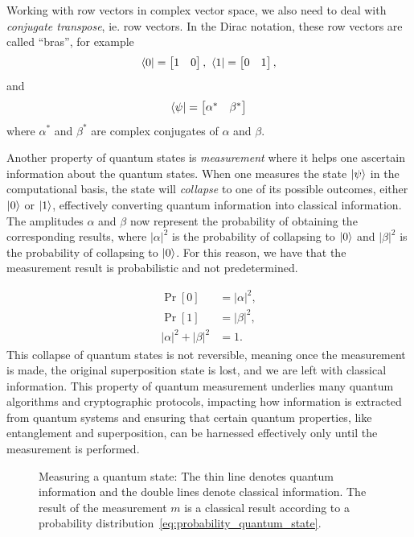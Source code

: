 \documentclass[cryptography,review,submit,pdftex,moreauthors,amsmath,amssymb,aps,strict]{Definitions/mdpi}
\begin{document}
Working with row vectors in complex vector space, we also need to deal with \textit{conjugate transpose}, ie. row vectors. In the Dirac notation, these row vectors are called ``bras'', for example
\begin{align}
    \bra{0}= \begin{bmatrix} 1 & 0 \end{bmatrix} \text{, }\bra{1}=\begin{bmatrix} 0 & 1
\end{bmatrix},
\end{align}
and 
\begin{align}
    \bra{\psi}=  \begin{bmatrix} \alpha^* & \beta^*\end{bmatrix}
\end{align}
where $\alpha^*$ and $\beta^*$ are complex conjugates of $\alpha$ and $\beta$.

Another property of quantum states is \textit{measurement} where it helps one ascertain information about the quantum states. When one measures the state $\ket{\psi}$ in the computational basis, the state will \textit{collapse} to one of its possible outcomes, either $\ket{0}$ or $\ket{1}$, effectively converting quantum information into classical information. The amplitudes $\alpha$ and $\beta$ now represent the probability of obtaining the corresponding results, where $|\alpha|^2$ is the probability of collapsing to $\ket{0}$ and $|\beta|^2$  is the probability of collapsing to $\ket{0}$. For this reason, we have that the measurement result is probabilistic and not predetermined.

\begin{align}
\Pr[0] &= |\alpha|^2,\nonumber\\
\Pr[1] &= |\beta|^2,\nonumber\\
|\alpha|^2 + |\beta|^2 &= 1.
\label{eq:probability_quantum_state}
\end{align}
This collapse of quantum states is not reversible, meaning once the measurement is made, the original superposition state is lost, and we are left with classical information. This property of quantum measurement underlies many quantum algorithms and cryptographic protocols, impacting how information is extracted from quantum systems and ensuring that certain quantum properties, like entanglement and superposition, can be harnessed effectively only until the measurement is performed.

\begin{figure}[!htbp]
    \center
    
    \caption{Measuring a quantum state:  The thin line denotes quantum information and the double lines denote classical information. The result of the measurement $m$ is a classical result according to a probability distribution~\eqref{eq:probability_quantum_state}.}
    \label{fig:measurement}
\end{figure}
\end{document}
